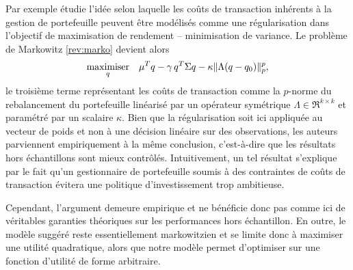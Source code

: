 Par exemple \cite{olivares2015robust} étudie l'idée selon laquelle les coûts de
transaction inhérents à la gestion de portefeuille peuvent être modélisés comme une
régularisation dans l'objectif de maximisation de rendement -- minimisation de variance. Le
problème de Markowitz \eqref{rev:marko} devient alors
\begin{equation}
  \maximizeEquation[q]{\mu^Tq - \gamma\,q^T\Sigma q - \kappa\|\Lambda(q-q_0)\|_p^p,}
\end{equation}
le troisième terme représentant les coûts de transaction comme la $p$-norme du
rebalancement du portefeuille linéarisé par un opérateur symétrique
$\Lambda \in \Re^{k \times k}$ et paramétré par un scalaire $\kappa$. Bien que la régularisation soit ici
appliquée au vecteur de poids et non à une décision linéaire sur des observations, les
auteurs parviennent empiriquement à la même conclusion, c'est-à-dire que les résultats
hors échantillons sont mieux contrôlés. Intuitivement, un tel résultat s'explique par le
fait qu'un gestionnaire de portefeuille soumis à des contraintes de coûts de transaction
évitera une politique d'investissement trop ambitieuse.

Cependant, l'argument demeure empirique et ne bénéficie donc pas comme ici de véritables
garanties théoriques sur les performances hors échantillon. En outre, le modèle suggéré
reste essentiellement markowitzien et se limite donc à maximiser une utilité quadratique,
alors que notre modèle permet d'optimiser sur une fonction d'utilité de forme arbitraire.

